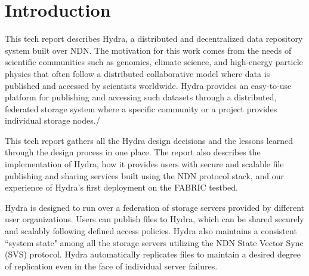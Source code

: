 \section{Introduction} \label{sec:introduction}
This tech report describes Hydra, a distributed and decentralized data repository system built over NDN. The motivation for this work comes from the needs of scientific communities such as genomics, climate science, and high-energy particle physics that often follow a distributed collaborative model where data is published and accessed by scientists worldwide. Hydra provides an easy-to-use platform for publishing and accessing such datasets through a distributed, federated storage system where a specific community or a project provides individual storage nodes./ %

This tech report gathers all the Hydra design decisions and the lessons learned through the design process in one place. The report also describes the implementation of Hydra, how it provides users with secure and scalable file publishing and sharing services built using the NDN protocol stack, and our experience of Hydra's first deployment on the FABRIC testbed\cite{8972790}.

Hydra is designed to run over a federation of storage servers provided by different user organizations. Users can publish files to Hydra, which can be shared securely and scalably following defined access policies. Hydra also maintains a consistent ``system state" among all the storage servers utilizing the NDN State Vector Sync (SVS) protocol\cite{8599772}.
Hydra automatically replicates files to maintain a desired degree of replication even in the face of individual server failures.

